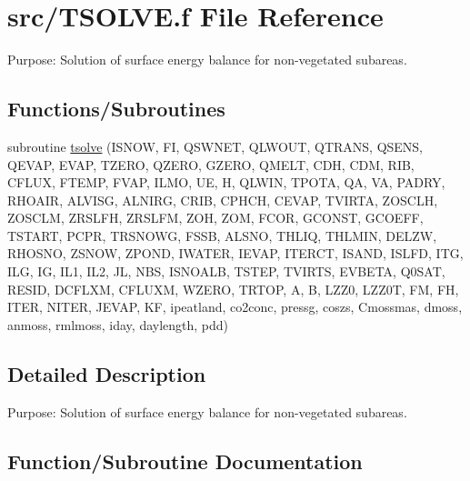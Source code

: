 \hypertarget{TSOLVE_8f}{}\section{src/\+T\+S\+O\+L\+V\+E.f File Reference}
\label{TSOLVE_8f}


Purpose\+: Solution of surface energy balance for non-\/vegetated subareas.  


\subsection*{Functions/\+Subroutines}
\begin{DoxyCompactItemize}
\item 
subroutine \hyperlink{TSOLVE_8f_a6e73723f0d6d00d8dc1c69c462493fe2}{tsolve} (I\+S\+N\+O\+W, F\+I, Q\+S\+W\+N\+E\+T, Q\+L\+W\+O\+U\+T, Q\+T\+R\+A\+N\+S, Q\+S\+E\+N\+S, Q\+E\+V\+A\+P, E\+V\+A\+P, T\+Z\+E\+R\+O, Q\+Z\+E\+R\+O, G\+Z\+E\+R\+O, Q\+M\+E\+L\+T, C\+D\+H, C\+D\+M, R\+I\+B, C\+F\+L\+U\+X, F\+T\+E\+M\+P, F\+V\+A\+P, I\+L\+M\+O, U\+E, H, Q\+L\+W\+I\+N, T\+P\+O\+T\+A, Q\+A, V\+A, P\+A\+D\+R\+Y, R\+H\+O\+A\+I\+R, A\+L\+V\+I\+S\+G, A\+L\+N\+I\+R\+G, C\+R\+I\+B, C\+P\+H\+C\+H, C\+E\+V\+A\+P, T\+V\+I\+R\+T\+A, Z\+O\+S\+C\+L\+H, Z\+O\+S\+C\+L\+M, Z\+R\+S\+L\+F\+H, Z\+R\+S\+L\+F\+M, Z\+O\+H, Z\+O\+M, F\+C\+O\+R, G\+C\+O\+N\+S\+T, G\+C\+O\+E\+F\+F, T\+S\+T\+A\+R\+T, P\+C\+P\+R, T\+R\+S\+N\+O\+W\+G, F\+S\+S\+B, A\+L\+S\+N\+O, T\+H\+L\+I\+Q, T\+H\+L\+M\+I\+N, D\+E\+L\+Z\+W, R\+H\+O\+S\+N\+O, Z\+S\+N\+O\+W, Z\+P\+O\+N\+D, I\+W\+A\+T\+E\+R, I\+E\+V\+A\+P, I\+T\+E\+R\+C\+T, I\+S\+A\+N\+D, I\+S\+L\+F\+D, I\+T\+G, I\+L\+G, I\+G, I\+L1, I\+L2, J\+L, N\+B\+S, I\+S\+N\+O\+A\+L\+B, T\+S\+T\+E\+P, T\+V\+I\+R\+T\+S, E\+V\+B\+E\+T\+A, Q0\+S\+A\+T, R\+E\+S\+I\+D, D\+C\+F\+L\+X\+M, C\+F\+L\+U\+X\+M, W\+Z\+E\+R\+O, T\+R\+T\+O\+P, A, B, L\+Z\+Z0, L\+Z\+Z0\+T, F\+M, F\+H, I\+T\+E\+R, N\+I\+T\+E\+R, J\+E\+V\+A\+P, K\+F, ipeatland, co2conc, pressg, coszs, Cmossmas, dmoss, anmoss, rmlmoss, iday, daylength, pdd)
\end{DoxyCompactItemize}


\subsection{Detailed Description}
Purpose\+: Solution of surface energy balance for non-\/vegetated subareas. 



\subsection{Function/\+Subroutine Documentation}
\hypertarget{TSOLVE_8f_a6e73723f0d6d00d8dc1c69c462493fe2}{}
